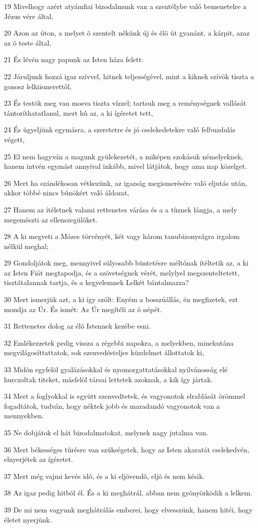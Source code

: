 \par 19 Mivelhogy azért atyámfiai bizodalmunk van a szentélybe való bemenetelre a Jézus vére által,
\par 20 Azon az úton, a melyet õ szentelt nékünk új és élõ út gyanánt, a kárpit, azaz az õ teste által,
\par 21 És lévén nagy papunk az Isten háza felett:
\par 22 Járuljunk hozzá igaz szívvel, hitnek teljességével, mint a kiknek szívök tiszta a gonosz lelkiismerettõl,
\par 23 És testök meg van mosva tiszta vízzel; tartsuk meg a reménységnek vallását tántoríthatatlanul, mert hû az, a ki ígéretet tett,
\par 24 És ügyeljünk egymásra, a szeretetre és jó cselekedetekre való felbuzdulás végett,
\par 25 El nem hagyván a magunk gyülekezetét, a miképen szokásuk némelyeknek, hanem intvén egymást annyival inkább, mivel látjátok, hogy ama nap közelget.
\par 26 Mert ha szándékosan vétkezünk, az igazság megismerésére való eljutás után, akkor többé nincs bûnökért való áldozat,
\par 27 Hanem az ítéletnek valami rettenetes várása és a a tûznek lángja, a mely megemészti az ellenszegülõket.
\par 28 A ki megveti a Mózes törvényét, két vagy három tanubizonyságra  irgalom nélkül meghal;
\par 29 Gondoljátok meg, mennyivel súlyosabb büntetésre méltónak ítéltetik az, a ki az Isten Fiát megtapodja, és a szövetségnek vérét, melylyel megszenteltetett, tisztátalannak tartja, és a kegyelemnek Lelkét bántalmazza?
\par 30 Mert ismerjük azt, a ki így szólt: Enyém a bosszúállás, én megfizetek, ezt mondja az Úr. És ismét: Az Úr megítéli az õ népét.
\par 31 Rettenetes dolog az élõ Istennek kezébe esni.
\par 32 Emlékezzetek pedig vissza a régebbi napokra, a melyekben, minekutána megvilágosíttattatok, sok szenvedésteljes küzdelmet állottatok ki,
\par 33 Midõn egyfelõl gyalázásokkal és nyomorgattatásokkal nyilvánosság elé hurczoltak titeket, másfelõl társai lettetek azoknak, a kik így jártak.
\par 34 Mert a foglyokkal is együtt szenvedtetek, és vagyonotok elrablását örömmel fogadtátok, tudván, hogy néktek jobb és maradandó vagyonotok van a mennyekben.
\par 35 Ne dobjátok el hát bizodalmatokat, melynek nagy jutalma van.
\par 36 Mert békességes tûrésre van szükségetek, hogy az Isten akaratát cselekedvén, elnyerjétek az ígéretet.
\par 37 Mert még vajmi kevés idõ, és a ki eljövendõ, eljõ és nem késik.
\par 38 Az igaz pedig hitbõl él. És a ki meghátrál,  abban nem gyönyörködik a lelkem.
\par 39 De mi nem vagyunk meghátrálás emberei, hogy elvesszünk, hanem hitéi, hogy életet nyerjünk.

